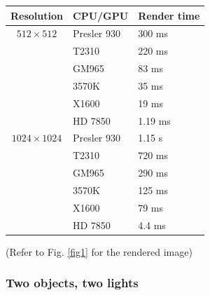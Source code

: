 \documentclass[english,fleqn,10pt,twocolumn]{article}
\begin{document}
\begin{tabular}{c|ll}
    Resolution         & CPU/GPU     & Render time \\ \hline \hline
    $ 512 \times  512$ & Presler 930 & 300 ms      \\ \cline{2-3}
                       & T2310       & 220 ms      \\ \cline{2-3}
                       & GM965       &  83 ms      \\ \cline{2-3}
                       & 3570K       &  35 ms      \\ \cline{2-3}
                       & X1600       &  19 ms      \\ \cline{2-3}
                       & HD 7850     & 1.19 ms     \\ \hline \hline
    $1024 \times 1024$ & Presler 930 & 1.15 s      \\ \cline{2-3}
                       & T2310       & 720 ms      \\ \cline{2-3}
                       & GM965       & 290 ms      \\ \cline{2-3}
                       & 3570K       & 125 ms      \\ \cline{2-3}
                       & X1600       &  79 ms      \\ \cline{2-3}
                       & HD 7850     & 4.4 ms
\end{tabular}

(Refer to Fig. \ref{fig1} for the rendered image)

\subsubsection{Two objects, two lights}
\end{document}
